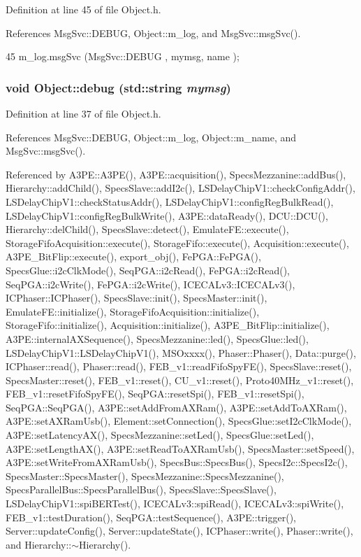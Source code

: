 Definition at line 45 of file Object.h.

References MsgSvc::DEBUG, Object::m\_\-log, and MsgSvc::msgSvc().


\begin{DoxyCode}
45 { m_log.msgSvc (MsgSvc::DEBUG   , mymsg, name ); }
\end{DoxyCode}
\hypertarget{classObject_aac010553f022165573714b7014a15f0d}{
\subsubsection[{debug}]{\setlength{\rightskip}{0pt plus 5cm}void Object::debug (std::string {\em mymsg})}}
\label{classObject_aac010553f022165573714b7014a15f0d}


Definition at line 37 of file Object.h.

References MsgSvc::DEBUG, Object::m\_\-log, Object::m\_\-name, and MsgSvc::msgSvc().

Referenced by A3PE::A3PE(), A3PE::acquisition(), SpecsMezzanine::addBus(), Hierarchy::addChild(), SpecsSlave::addI2c(), LSDelayChipV1::checkConfigAddr(), LSDelayChipV1::checkStatusAddr(), LSDelayChipV1::configRegBulkRead(), LSDelayChipV1::configRegBulkWrite(), A3PE::dataReady(), DCU::DCU(), Hierarchy::delChild(), SpecsSlave::detect(), EmulateFE::execute(), StorageFifoAcquisition::execute(), StorageFifo::execute(), Acquisition::execute(), A3PE\_\-BitFlip::execute(), export\_\-obj(), FePGA::FePGA(), SpecsGlue::i2cClkMode(), SeqPGA::i2cRead(), FePGA::i2cRead(), SeqPGA::i2cWrite(), FePGA::i2cWrite(), ICECALv3::ICECALv3(), ICPhaser::ICPhaser(), SpecsSlave::init(), SpecsMaster::init(), EmulateFE::initialize(), StorageFifoAcquisition::initialize(), StorageFifo::initialize(), Acquisition::initialize(), A3PE\_\-BitFlip::initialize(), A3PE::internalAXSequence(), SpecsMezzanine::led(), SpecsGlue::led(), LSDelayChipV1::LSDelayChipV1(), MSOxxxx(), Phaser::Phaser(), Data::purge(), ICPhaser::read(), Phaser::read(), FEB\_\-v1::readFifoSpyFE(), SpecsSlave::reset(), SpecsMaster::reset(), FEB\_\-v1::reset(), CU\_\-v1::reset(), Proto40MHz\_\-v1::reset(), FEB\_\-v1::resetFifoSpyFE(), SeqPGA::resetSpi(), FEB\_\-v1::resetSpi(), SeqPGA::SeqPGA(), A3PE::setAddFromAXRam(), A3PE::setAddToAXRam(), A3PE::setAXRamUsb(), Element::setConnection(), SpecsGlue::setI2cClkMode(), A3PE::setLatencyAX(), SpecsMezzanine::setLed(), SpecsGlue::setLed(), A3PE::setLengthAX(), A3PE::setReadToAXRamUsb(), SpecsMaster::setSpeed(), A3PE::setWriteFromAXRamUsb(), SpecsBus::SpecsBus(), SpecsI2c::SpecsI2c(), SpecsMaster::SpecsMaster(), SpecsMezzanine::SpecsMezzanine(), SpecsParallelBus::SpecsParallelBus(), SpecsSlave::SpecsSlave(), LSDelayChipV1::spiBERTest(), ICECALv3::spiRead(), ICECALv3::spiWrite(), FEB\_\-v1::testDuration(), SeqPGA::testSequence(), A3PE::trigger(), Server::updateConfig(), Server::updateState(), ICPhaser::write(), Phaser::write(), and Hierarchy::$\sim$Hierarchy().


